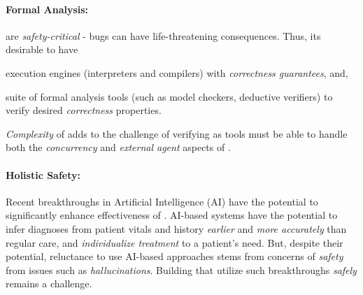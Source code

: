 \paragraph{Formal Analysis:} \CDSS{} are \emph{safety-critical} -
bugs can have life-threatening consequences. Thus, its desirable to have
\begin{enumerate*}[label=(\alph*)]
  \item execution engines (interpreters and compilers) with \emph{correctness guarantees}, and,
  \item suite of formal analysis tools (such as model checkers, deductive
    verifiers) to verify desired \emph{correctness} properties.
\end{enumerate*}
\emph{Complexity} of \CDSSs{} adds to the challenge of verifying
\CDSSs{} as tools must be able to handle both the \emph{concurrency} and
\emph{external agent} aspects of \CDSSs{}.

\paragraph{Holistic Safety:} Recent breakthroughs in Artificial Intelligence
(AI) have the potential to significantly enhance effectiveness
of \CDSSs{}. AI-based systems have the potential to infer diagnoses from patient
vitals and history \emph{earlier} and \emph{more accurately} than regular
care, and \emph{individualize treatment} to a patient's need.
But, despite their potential, reluctance to use AI-based approaches
stems from concerns of \emph{safety} from issues such as \emph{hallucinations}.
Building \CDSSs{} that utilize such breakthroughs \emph{safely} remains
a challenge.

